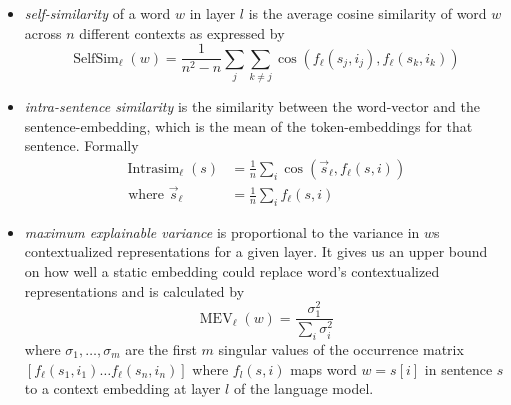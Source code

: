 \documentclass[a4paper,12pt,twoside,openright]{report}
\begin{document}
\begin{itemize}
\item \textit{self-similarity} of a word $w$ in layer $l$ is the average cosine similarity of word $w$ across $n$ different contexts as expressed by 
$$
\operatorname{SelfSim}_{\ell}(w)=\frac{1}{n^{2}-n} \sum_{j} \sum_{k \neq j} \cos \left(f_{\ell}\left(s_{j}, i_{j}\right), f_{\ell}\left(s_{k}, i_{k}\right)\right)
$$
\item \textit{intra-sentence similarity} is the similarity between the word-vector and the sentence-embedding, which is the mean of the token-embeddings for that sentence. 
Formally
$$
\begin{aligned} \operatorname{Intrasim}_{\ell}(s) &=\frac{1}{n} \sum_{i} \cos \left(\vec{s}_{\ell}, f_{\ell}(s, i)\right) \\ \text { where } \vec{s}_{\ell} &=\frac{1}{n} \sum_{i} f_{\ell}(s, i) \end{aligned}
$$
\item \textit{maximum explainable variance} is proportional to the variance in $w$s contextualized representations for a given layer.
It gives us an upper bound on how well a static embedding could replace word's contextualized representations and is calculated by 
$$
\operatorname{MEV}_{\ell}(w)=\frac{\sigma_{1}^{2}}{\sum_{i} \sigma_{i}^{2}}
$$
where $\sigma_1, \ldots, \sigma_m$ are the first $m$ singular values of the occurrence matrix $
\left[f_{\ell}\left(s_{1}, i_{1}\right) \ldots f_{\ell}\left(s_{n}, i_{n}\right)\right]
$ where $f_l(s, i)$ maps word $w = s[i]$ in sentence $s$ to a context embedding at layer $l$ of the language model.
\end{itemize}
\end{document}
